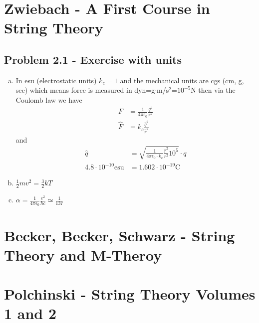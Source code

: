 \documentclass[../main.tex]{subfiles}
\begin{document}
\section{{\sc Zwiebach} - A First Course in String Theory }

\subsection{Problem 2.1 - Exercise with units}
\begin{enumerate}[(a)]
\item In esu (electrostatic units) $k_c=1$ and the mechanical units are cgs (cm, g, sec) which means force is measured in dyn=g$\cdot$m/s$^2$=$10^{-5}$N then via the Coulomb law we have
\begin{align}
F
&=\frac{1}{4\pi\epsilon_0}\frac{q^2}{r^2}\\
\hat F&=k_c\frac{\hat q^2}{\hat r^2}
\end{align}
and
\begin{align}
\hat q
&=\sqrt{\frac{1}{4\pi\epsilon_0\cdot k_c}\frac{\hat r^2}{r^2}10^5}\cdot q\\
4.8\cdot10^{-10}\text{esu}&=1.602\cdot10^{-19}\text{C}
\end{align}


\item $\frac{1}{2}mv^2=\frac{3}{2}kT$
\item $\alpha=\frac{1}{4\pi\epsilon_0}\frac{e^2}{\hbar c}\simeq\frac{1}{137}$
\end{enumerate}


\section{{\sc Becker, Becker, Schwarz} - String Theory and M-Theroy }

\section{{\sc Polchinski} - String Theory Volumes 1 and 2 }
\end{document}
